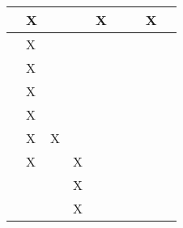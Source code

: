 \begin{longtable}{|l|llllllll|}
    \cite[]{Reda.2020}            & \multicolumn{1}{l|}{X}   & \multicolumn{1}{l|}{}     & \multicolumn{1}{l|}{}  & \multicolumn{1}{l|}{X}   & \multicolumn{1}{l|}{}   & \multicolumn{1}{l|}{}   & \multicolumn{1}{l|}{X}   & \multicolumn{1}{l|}{}      \\ \hline
    \cite[]{Ningombam.2022}       & \multicolumn{1}{l|}{X}   & \multicolumn{1}{l|}{}     & \multicolumn{1}{l|}{}   & \multicolumn{1}{l|}{}   & \multicolumn{1}{l|}{}   & \multicolumn{1}{l|}{}   & \multicolumn{1}{l|}{}   & \multicolumn{1}{l|}{}      \\ \hline
    \cite[]{Arulkumaran.2017}     & \multicolumn{1}{l|}{X}   & \multicolumn{1}{l|}{}     & \multicolumn{1}{l|}{}   & \multicolumn{1}{l|}{}   & \multicolumn{1}{l|}{}   & \multicolumn{1}{l|}{}   & \multicolumn{1}{l|}{}   & \multicolumn{1}{l|}{}      \\ \hline
    \cite[]{Huang.2017}           & \multicolumn{1}{l|}{X}   & \multicolumn{1}{l|}{}     & \multicolumn{1}{l|}{}   & \multicolumn{1}{l|}{}   & \multicolumn{1}{l|}{}   & \multicolumn{1}{l|}{}   & \multicolumn{1}{l|}{}   & \multicolumn{1}{l|}{}      \\ \hline
    \cite[]{Mnih.2013}            & \multicolumn{1}{l|}{X}   & \multicolumn{1}{l|}{}     & \multicolumn{1}{l|}{}   & \multicolumn{1}{l|}{}   & \multicolumn{1}{l|}{}   & \multicolumn{1}{l|}{}   & \multicolumn{1}{l|}{}   & \multicolumn{1}{l|}{}      \\ \hline
    \cite[]{Wong.2022}            & \multicolumn{1}{l|}{X}   & \multicolumn{1}{l|}{X}    & \multicolumn{1}{l|}{}   & \multicolumn{1}{l|}{}   & \multicolumn{1}{l|}{}   & \multicolumn{1}{l|}{}   & \multicolumn{1}{l|}{}   & \multicolumn{1}{l|}{}      \\ \hline
    \cite[]{Hussein.2017}         & \multicolumn{1}{l|}{X}   & \multicolumn{1}{l|}{}    & \multicolumn{1}{l|}{X}   & \multicolumn{1}{l|}{}   & \multicolumn{1}{l|}{}   & \multicolumn{1}{l|}{}   & \multicolumn{1}{l|}{}   & \multicolumn{1}{l|}{}      \\ \hline
    \cite[]{attia.2018}           & \multicolumn{1}{l|}{}   & \multicolumn{1}{l|}{}    & \multicolumn{1}{l|}{X}   & \multicolumn{1}{l|}{}   & \multicolumn{1}{l|}{}   & \multicolumn{1}{l|}{}   & \multicolumn{1}{l|}{}   & \multicolumn{1}{l|}{}      \\ \hline
    \cite[]{gao.2014}             & \multicolumn{1}{l|}{}   & \multicolumn{1}{l|}{}    & \multicolumn{1}{l|}{X}   & \multicolumn{1}{l|}{}   & \multicolumn{1}{l|}{}   & \multicolumn{1}{l|}{}   & \multicolumn{1}{l|}{}   & \multicolumn{1}{l|}{}      \\ \hline

\end{longtable}
